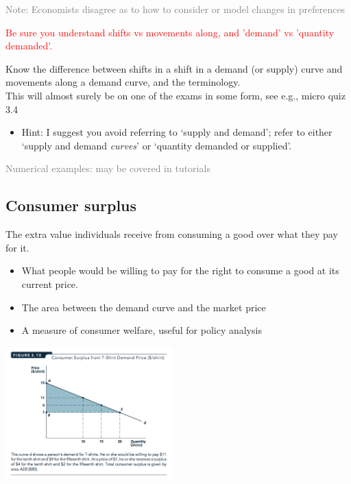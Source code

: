 \documentclass[]{article}
\providecommand{\tightlist}{%
  \setlength{\itemsep}{0pt}\setlength{\parskip}{0pt}}
\begin{document}
\bigskip

\textcolor{gray}{Note: Economists disagree as to how to consider or model changes in preferences}

\textcolor{red}{Be sure you understand shifts vs movements along, and 'demand' vs 'quantity demanded'.}

Know the difference between shifts in a shift in a demand (or supply) curve and movements along a demand curve, and the terminology.\\
This will almost surely be on one of the exams in some form, see e.g., micro quiz 3.4\\

\begin{itemize}
\tightlist
\item
  Hint: I suggest you avoid referring to `supply and demand'; refer to either `supply and demand \emph{curves}' or `quantity demanded or supplied'.
\end{itemize}

\textcolor{gray}{Numerical examples: may be covered in tutorials}

\hypertarget{consumer-surplus}{%
\subsection{Consumer surplus}\label{consumer-surplus}}

\begin{description}
\tightlist
\item[Consumer surplus]
The extra value individuals receive from consuming a good over what they pay for it.
\end{description}

\bigskip

\begin{itemize}
\tightlist
\item
  What people would be willing to pay for the right to consume a good at its current price.
\item
  The area between the demand curve and the market price
\item
  A measure of consumer welfare, useful for policy analysis
\end{itemize}

\includegraphics[height=2in]{picsfigs/cons_surplus.png}
\end{document}
